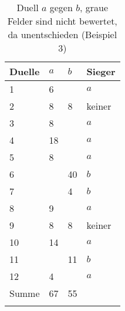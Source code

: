 
\begin{longtable}[c]{|l|l|l|l|}
\hline
Duelle & $a$  & $b$  & Sieger \\ \hline
\endfirsthead
%
\endhead
%
1      & 6  &    & $a$      \\ \hline
\rowcolor[HTML]{9B9B9B} 
2      & 8  & 8  & keiner \\ \hline
3      & 8  &    & $a$      \\ \hline
4      & 18 &    & $a$     \\ \hline
5      & 8  &    & $a$    \\ \hline
6      &    & 40 & $b$    \\ \hline
7      &    & 4  & $b$     \\ \hline
8      & 9  &    & $a$    \\ \hline
\rowcolor[HTML]{9B9B9B} 
9      & 8  & 8  & keiner \\ \hline
10     & 14 &    & $a$    \\ \hline
11     &    & 11 & $b$    \\ \hline
12     & 4  &    & $a$    \\ \hline
Summe  & 67 & 55 &        \\ \hline
\caption{Duell $a$ gegen $b$, graue Felder sind nicht bewertet, da unentschieden (Beispiel 3)}
\label{beispiel3ab}\\
\end{longtable}